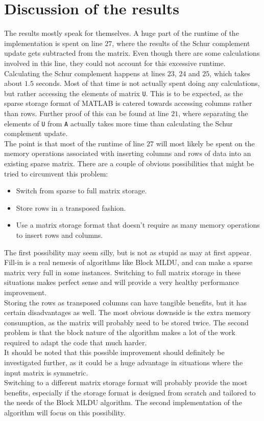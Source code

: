 \newpage

\section{Discussion of the results}

\noindent The results mostly speak for themselves. A huge part of the runtime of the implementation is spent on line $27$, where the results of the Schur complement update gets subtracted from the matrix. Even though there are some calculations involved in this line, they could not account for this excessive runtime.\\

\noindent Calculating the Schur complement happens at lines $23$, $24$ and $25$, which takes about $1.5$ seconds. Most of that time is not actually spent doing any calculations, but rather accessing the elements of matrix \texttt{U}. This is to be expected, as the sparse storage format of MATLAB is catered towards accessing columns rather than rows. Further proof of this can be found at line $21$, where separating the elements of \texttt{U} from \texttt{A} actually takes more time than calculating the Schur complement update.\\

\noindent The point is that most of the runtime of line $27$ will most likely be spent on the memory operations associated with inserting columns and rows of data into an existing sparse matrix. There are a couple of obvious possibilities that might be tried to circumvent this problem:

\begin{itemize}
    \item Switch from sparse to full matrix storage.
    \item Store rows in a transposed fashion.
    \item Use a matrix storage format that doesn't require as many memory operations to insert rows and columns.
\end{itemize}

\noindent The first possibility may seem silly, but is not as stupid as may at first appear. Fill-in is a real nemesis of algorithms like Block MLDU, and can make a sparse matrix very full in some instances. Switching to full matrix storage in these situations makes perfect sense and will provide a very healthy performance improvement.\\

\noindent Storing the rows as transposed columns can have tangible benefits, but it has certain disadvantages as well. The most obvious downside is the extra memory consumption, as the matrix will probably need to be stored twice. The second problem is that the block nature of the algorithm makes a lot of the work required to adapt the code that much harder.\\
\noindent It should be noted that this possible improvement should definitely be investigated further, as it could be a huge advantage in situations where the input matrix is symmetric.\\

\noindent Switching to a different matrix storage format will probably provide the most benefits, especially if the storage format is designed from scratch and tailored to the needs of the Block MLDU algorithm. The second implementation of the algorithm will focus on this possibility.
